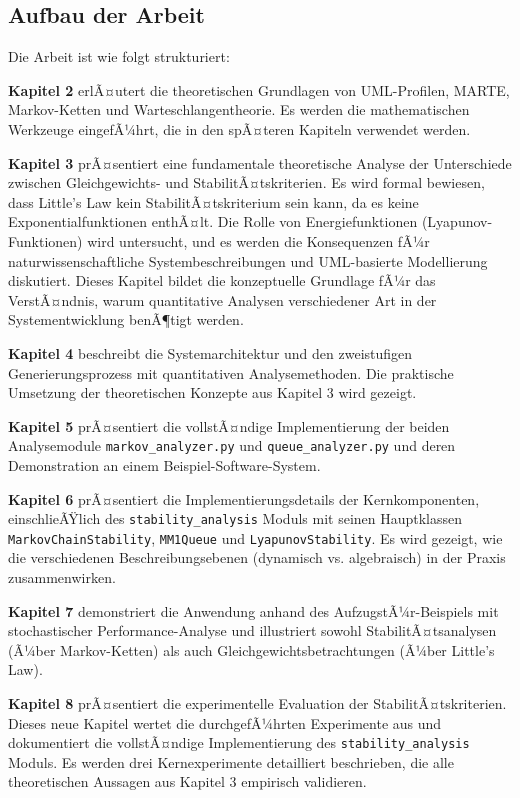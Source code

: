 ﻿\documentclass[a4paper,12pt]{scrreprt}
\theoremstyle{definition}
\begin{document}
\subsection{Aufbau der Arbeit}

Die Arbeit ist wie folgt strukturiert:

\textbf{Kapitel 2} erlÃ¤utert die theoretischen Grundlagen von UML-Profilen, MARTE, Markov-Ketten und Warteschlangentheorie. Es werden die mathematischen Werkzeuge eingefÃ¼hrt, die in den spÃ¤teren Kapiteln verwendet werden.

\textbf{Kapitel 3} prÃ¤sentiert eine fundamentale theoretische Analyse der Unterschiede zwischen Gleichgewichts- und StabilitÃ¤tskriterien. Es wird formal bewiesen, dass Little's Law kein StabilitÃ¤tskriterium sein kann, da es keine Exponentialfunktionen enthÃ¤lt. Die Rolle von Energiefunktionen (Lyapunov-Funktionen) wird untersucht, und es werden die Konsequenzen fÃ¼r naturwissenschaftliche Systembeschreibungen und UML-basierte Modellierung diskutiert. Dieses Kapitel bildet die konzeptuelle Grundlage fÃ¼r das VerstÃ¤ndnis, warum quantitative Analysen verschiedener Art in der Systementwicklung benÃ¶tigt werden.

\textbf{Kapitel 4} beschreibt die Systemarchitektur und den zweistufigen Generierungsprozess mit quantitativen Analysemethoden. Die praktische Umsetzung der theoretischen Konzepte aus Kapitel 3 wird gezeigt.

\textbf{Kapitel 5} prÃ¤sentiert die vollstÃ¤ndige Implementierung der beiden
Analysemodule \texttt{markov\_analyzer.py} und \texttt{queue\_analyzer.py}
und deren Demonstration an einem Beispiel-Software-System.

\textbf{Kapitel 6} prÃ¤sentiert die Implementierungsdetails der Kernkomponenten, einschlieÃŸlich des \texttt{stability\_analysis} Moduls mit seinen Hauptklassen \texttt{MarkovChainStability}, \texttt{MM1Queue} und \texttt{LyapunovStability}. Es wird gezeigt, wie die verschiedenen Beschreibungsebenen (dynamisch vs. algebraisch) in der Praxis zusammenwirken.

\textbf{Kapitel 7} demonstriert die Anwendung anhand des AufzugstÃ¼r-Beispiels mit stochastischer Performance-Analyse und illustriert sowohl StabilitÃ¤tsanalysen (Ã¼ber Markov-Ketten) als auch Gleichgewichtsbetrachtungen (Ã¼ber Little's Law).

\textbf{Kapitel 8} prÃ¤sentiert die experimentelle Evaluation der StabilitÃ¤tskriterien. Dieses neue Kapitel wertet die durchgefÃ¼hrten Experimente aus und dokumentiert die vollstÃ¤ndige Implementierung des \texttt{stability\_analysis} Moduls. Es werden drei Kernexperimente detailliert beschrieben, die alle theoretischen Aussagen aus Kapitel 3 empirisch validieren.
\end{document}

